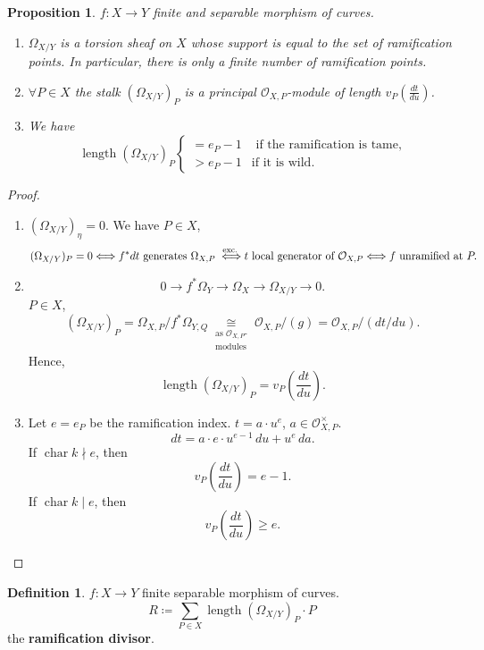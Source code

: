\documentclass[12pt]{article}
\DeclareMathOperator{\chara}{char}
\DeclareMathOperator{\length}{length}
\newtheorem*{proposition}{Proposition}
\theoremstyle{definition}
\newtheorem*{definition}{Definition}
\begin{document}
\begin{proposition}
$f:X\rightarrow Y$ finite and separable morphism of curves.

\begin{enumerate}[label=\arabic*)]
\item $\Omega_{X/Y}$ is a torsion sheaf on $X$ whose support is equal to the set of ramification points. In particular, there is only a finite number of ramification points.

\item $\forall P\in X$ the stalk $(\Omega_{X/Y})_P$ is a principal $\mathcal{O}_{X,P}$-module of length $v_P(\frac{dt}{du})$.

\item We have
\[\length(\Omega_{X/Y})_P\left\{\begin{array}{ll}=e_P-1&\text{ if the ramification is tame,}\\>e_P-1&\text{if it is wild}.\end{array}\right.\]
\end{enumerate}
\end{proposition}

\begin{proof}
\begin{enumerate}[label=\arabic*)]
\item $(\Omega_{X/Y})_{\eta}=0$. We have $P\in X$,
\[(\Omega_{X/Y})_P=0\Longleftrightarrow f^*dt\text{ generates }\Omega_{X,P}\overset{\text{exc.}}{\vphantom{a}\Longleftrightarrow}t\text{ local generator of }\mathcal{O}_{X,P}\Longleftrightarrow f\text{ unramified at }P.\]

\item
\[0\longrightarrow f^*\Omega_Y\longrightarrow\Omega_X\longrightarrow\Omega_{X/Y}\longrightarrow0.\]
$P\in X$,
\[(\Omega_{X/Y})_P=\Omega_{X,P}/f^*\Omega_{Y,Q}\underset{\substack{\text{as }\mathcal{O}_{X,P}\text{-}\\\text{modules}}}{\cong}\mathcal{O}_{X,P}/(g)=\mathcal{O}_{X,P}/(dt/du).\]
Hence,
\[\length(\Omega_{X/Y})_P=v_P\left(\frac{dt}{du}\right).\]

\item Let $e=e_P$ be the ramification index. $t=a\cdot u^e$, $a\in\mathcal{O}_{X,P}^{\times}$.
\[dt=a\cdot e\cdot u^{e-1}\,du+u^e\,da.\]
If $\chara k\nmid e$, then
\[v_P\left(\frac{dt}{du}\right)=e-1.\]
If $\chara k\mid e$, then
\[v_P\left(\frac{dt}{du}\right)\geq e.\]
\end{enumerate}
\end{proof}

\begin{definition}
$f:X\rightarrow Y$ finite separable morphism of curves.
\[R\coloneqq\sum_{P\in X}\length(\Omega_{X/Y})_P\cdot P\]
the \textbf{ramification divisor}.
\end{definition}
\end{document}
